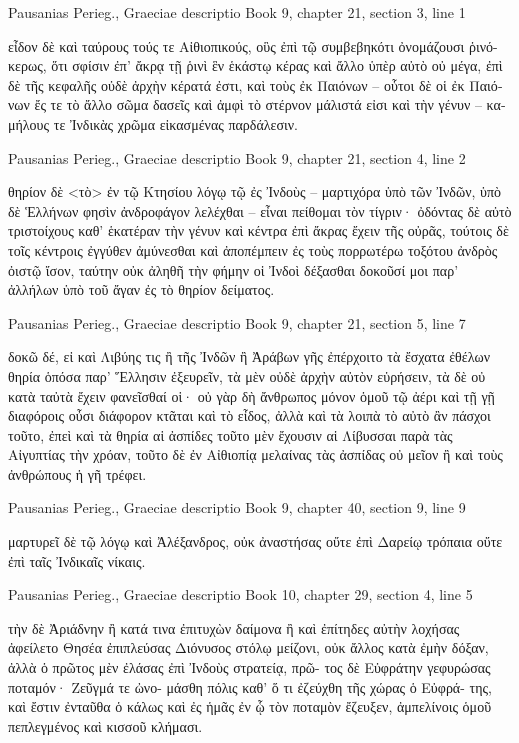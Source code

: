 \documentclass[12pt,letterpaper,twoside,final]{memoir}
\begin{document}
\begin{greek}
Pausanias Perieg., Graeciae descriptio 
Book 9, chapter 21, section 3, line 1

                         εἶδον δὲ καὶ ταύρους τούς τε 
Αἰθιοπικούς, οὓς ἐπὶ τῷ συμβεβηκότι ὀνομάζουσι ῥινό-
κερως, ὅτι σφίσιν ἐπ' ἄκρᾳ τῇ ῥινὶ ἓν ἑκάστῳ κέρας 
καὶ ἄλλο ὑπὲρ αὐτὸ οὐ μέγα, ἐπὶ δὲ τῆς κεφαλῆς οὐδὲ 
ἀρχὴν κέρατά ἐστι, καὶ τοὺς ἐκ Παιόνων – οὗτοι δὲ 
οἱ ἐκ Παιόνων ἔς τε τὸ ἄλλο σῶμα δασεῖς καὶ ἀμφὶ 
τὸ στέρνον μάλιστά εἰσι καὶ τὴν γένυν – καμήλους 
τε Ἰνδικὰς χρῶμα εἰκασμένας παρδάλεσιν. 



Pausanias Perieg., Graeciae descriptio 
Book 9, chapter 21, section 4, line 2

                                             θηρίον δὲ 
<τὸ> ἐν τῷ Κτησίου λόγῳ τῷ ἐς Ἰνδοὺς – μαρτιχόρα   
ὑπὸ τῶν Ἰνδῶν, ὑπὸ δὲ Ἑλλήνων φησὶν ἀνδροφάγον 
λελέχθαι – εἶναι πείθομαι τὸν τίγριν· ὀδόντας δὲ 
αὐτὸ τριστοίχους καθ' ἑκατέραν τὴν γένυν καὶ κέντρα 
ἐπὶ ἄκρας ἔχειν τῆς οὐρᾶς, τούτοις δὲ τοῖς κέντροις 
ἐγγύθεν ἀμύνεσθαι καὶ ἀποπέμπειν ἐς τοὺς πορρωτέρω 
τοξότου ἀνδρὸς ὀιστῷ ἴσον, ταύτην οὐκ ἀληθῆ τὴν 
φήμην οἱ Ἰνδοὶ δέξασθαι δοκοῦσί μοι παρ' ἀλλήλων 
ὑπὸ τοῦ ἄγαν ἐς τὸ θηρίον δείματος. 



Pausanias Perieg., Graeciae descriptio 
Book 9, chapter 21, section 5, line 7

                                 δοκῶ δέ, εἰ καὶ Λιβύης 
τις ἢ τῆς Ἰνδῶν ἢ Ἀράβων γῆς ἐπέρχοιτο τὰ ἔσχατα 
ἐθέλων θηρία ὁπόσα παρ' Ἕλλησιν ἐξευρεῖν, τὰ μὲν 
οὐδὲ ἀρχὴν αὐτὸν εὑρήσειν, τὰ δὲ οὐ κατὰ ταὐτὰ ἔχειν 
φανεῖσθαί οἱ· οὐ γὰρ δὴ ἄνθρωπος μόνον ὁμοῦ τῷ 
ἀέρι καὶ τῇ γῇ διαφόροις οὖσι διάφορον κτᾶται καὶ 
τὸ εἶδος, ἀλλὰ καὶ τὰ λοιπὰ τὸ αὐτὸ ἂν πάσχοι τοῦτο, 
ἐπεὶ καὶ τὰ θηρία αἱ ἀσπίδες τοῦτο μὲν ἔχουσιν αἱ 
Λίβυσσαι παρὰ τὰς Αἰγυπτίας τὴν χρόαν, τοῦτο δὲ ἐν 
Αἰθιοπίᾳ μελαίνας τὰς ἀσπίδας οὐ μεῖον ἢ καὶ τοὺς 
ἀνθρώπους ἡ γῆ τρέφει. 



Pausanias Perieg., Graeciae descriptio 
Book 9, chapter 40, section 9, line 9

             μαρτυρεῖ δὲ τῷ λόγῳ καὶ Ἀλέξανδρος, οὐκ 
ἀναστήσας οὔτε ἐπὶ Δαρείῳ τρόπαια οὔτε ἐπὶ ταῖς 
Ἰνδικαῖς νίκαις. 



Pausanias Perieg., Graeciae descriptio 
Book 10, chapter 29, section 4, line 5

                                                     τὴν 
δὲ Ἀριάδνην ἢ κατά τινα ἐπιτυχὼν δαίμονα ἢ καὶ 
ἐπίτηδες αὐτὴν λοχήσας ἀφείλετο Θησέα ἐπιπλεύσας 
Διόνυσος στόλῳ μείζονι, οὐκ ἄλλος κατὰ ἐμὴν δόξαν, 
ἀλλὰ ὁ πρῶτος μὲν ἐλάσας ἐπὶ Ἰνδοὺς στρατείᾳ, πρῶ-
τος δὲ Εὐφράτην γεφυρώσας ποταμόν· Ζεῦγμά τε ὠνο-
μάσθη πόλις καθ' ὅ τι ἐζεύχθη τῆς χώρας ὁ Εὐφρά-
της, καὶ ἔστιν ἐνταῦθα ὁ κάλως καὶ ἐς ἡμᾶς ἐν ᾧ τὸν 
ποταμὸν ἔζευξεν, ἀμπελίνοις ὁμοῦ πεπλεγμένος καὶ 
κισσοῦ κλήμασι. 




\end{greek}
\end{document}
